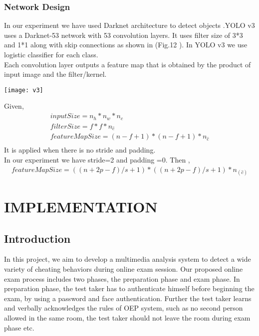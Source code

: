 \documentclass[12pt]{report}
\begin{document}
\subsection{Network Design}

In our experiment we have used Darknet architecture to detect objects .YOLO v3 uses a Darknet-53 network with 53 convolution layers. It uses filter size of 3*3 and 1*1 along with skip connections as shown in (Fig.12 ). In YOLO v3 we use logistic classifier for each class.\\

Each convolution layer outputs a feature map that is obtained by the product of input image and the filter/kernel.  \\
\begin{center}
\texttt{[image: v3]}
\end{center}

Given,
\begin{equation}\label{1}
\begin{split}
inputSize= n_h*n_w*n_c \\
filterSize=f*f*n_{\hat c}\\
featureMapSize=(n-f+1)*(n-f+1)*n_{\hat c}\\
\end{split}
\end{equation}
It is applied when there is no stride and padding.\\
In our experiment we have stride=2 and padding =0. Then ,\\
\begin{equation}\label{1}
\begin{split}
featureMapSize=((n+2p-f)/s+1)*((n+2p-f)/s+1)*n_(\hat c )
\end{split}
\end{equation}


\chapter{IMPLEMENTATION}
\section{Introduction}

In this project, we aim to develop a multimedia analysis system to detect a wide variety of cheating behaviors during online exam session. Our proposed online exam process includes two phases, the preparation phase and exam phase. In preparation phase, the test taker has to authenticate himself before beginning the exam, by using a password and face authentication. Further the test taker learns and verbally acknowledges the rules of OEP system, such as no second person allowed in the same room, the test taker should not leave the room during exam phase etc. \\
\end{document}

